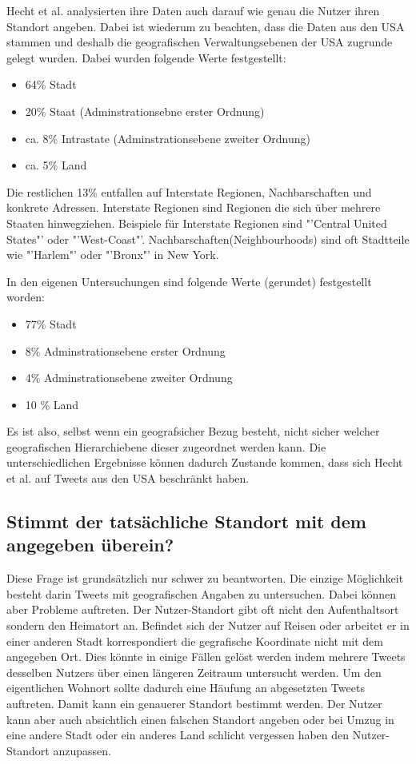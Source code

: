 			Hecht et al. analysierten ihre Daten auch darauf wie genau die Nutzer ihren Standort angeben.
			Dabei ist wiederum zu beachten, dass die Daten aus den USA stammen und deshalb die geografischen Verwaltungsebenen der USA zugrunde gelegt wurden.
			Dabei wurden folgende Werte festgestellt:

			\begin{itemize}
			 	\item 64\% Stadt 
			 	\item 20\% Staat (Adminstrationsebne erster Ordnung) 
			 	\item ca. 8\% Intrastate (Adminstrationsebene zweiter Ordnung) 
			 	\item ca. 5\% Land 
			 \end{itemize} 

			 Die restlichen 13\% entfallen auf Interstate Regionen, Nachbarschaften und konkrete Adressen. 
			 Interstate Regionen sind Regionen die sich über mehrere Staaten hinwegziehen. 
			 Beispiele für Interstate Regionen sind "'Central United States"' oder "'West-Coast"'.
			 Nachbarschaften(Neighbourhoods) sind oft Stadtteile wie "'Harlem"' oder "'Bronx"' in New York.

			 In den eigenen Untersuchungen sind folgende Werte (gerundet) festgestellt worden:

			\begin{itemize}
			 	\item 77\% Stadt %
			 	\item 8\% Adminstrationsebene erster Ordnung %
			 	\item 4\% Adminstrationsebene zweiter Ordnung %
			 	\item 10 \% Land %
			 \end{itemize} 

			Es ist also, selbst wenn ein geografsicher Bezug besteht, nicht sicher welcher geografischen Hierarchiebene dieser zugeordnet werden kann. 
			Die unterschiedlichen Ergebnisse können dadurch Zustande kommen, dass sich Hecht et al. auf Tweets aus den USA beschränkt haben.  


		\subsection*{Stimmt der tatsächliche Standort mit dem angegeben überein?}

			Diese Frage ist grundsätzlich nur schwer zu beantworten.
			Die einzige Möglichkeit besteht darin Tweets mit geografischen Angaben zu untersuchen.
			Dabei können aber Probleme auftreten. 
			Der Nutzer-Standort gibt oft nicht den Aufenthaltsort sondern den Heimatort an. 
			Befindet sich der Nutzer auf Reisen oder arbeitet er in einer anderen Stadt korrespondiert die gegrafische Koordinate nicht mit dem angegeben Ort.
			Dies könnte in einige Fällen gelöst werden indem mehrere Tweets desselben Nutzers über einen längeren Zeitraum untersucht werden. 
			Um den eigentlichen Wohnort sollte dadurch eine Häufung an abgesetzten Tweets auftreten.
			Damit kann ein genauerer Standort bestimmt werden.
			Der Nutzer kann aber auch absichtlich einen falschen Standort angeben oder bei Umzug in eine andere Stadt oder ein anderes Land schlicht vergessen haben den Nutzer-Standort anzupassen.

